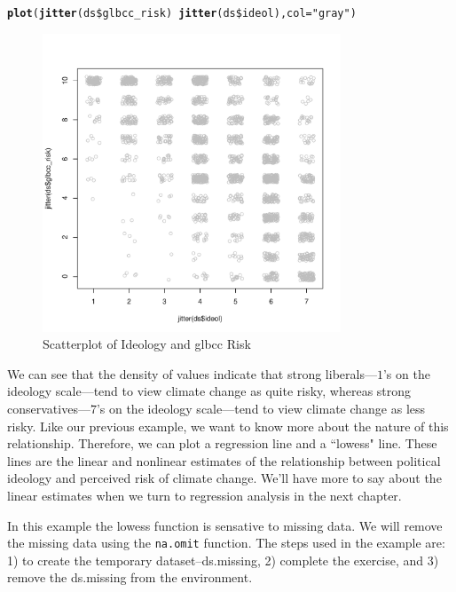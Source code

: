 \documentclass[11pt,openany]{book}\usepackage[]{graphicx}\usepackage[]{color}
\makeatletter
\newcommand{\hlstr}[1]{\textcolor[rgb]{0.192,0.494,0.8}{#1}}%
\newcommand{\hlopt}[1]{\textcolor[rgb]{0,0,0}{#1}}%
\newcommand{\hlstd}[1]{\textcolor[rgb]{0.345,0.345,0.345}{#1}}%
\newcommand{\hlkwc}[1]{\textcolor[rgb]{0.333,0.667,0.333}{#1}}%
\newcommand{\hlkwd}[1]{\textcolor[rgb]{0.737,0.353,0.396}{\textbf{#1}}}%
\newenvironment{kframe}{%
 \def\at@end@of@kframe{}%
 \ifinner\ifhmode%
  \def\at@end@of@kframe{\end{minipage}}%
  \begin{minipage}{\columnwidth}%
 \fi\fi%
 \def\FrameCommand##1{\hskip\@totalleftmargin \hskip-\fboxsep
 \colorbox{shadecolor}{##1}\hskip-\fboxsep
     \hskip-\linewidth \hskip-\@totalleftmargin \hskip\columnwidth}%
 \MakeFramed {\advance\hsize-\width
   \@totalleftmargin\z@ \linewidth\hsize
   \@setminipage}}%
 {\par\unskip\endMakeFramed%
 \at@end@of@kframe}
\newenvironment{knitrout}{}{} %
\renewenvironment{knitrout}{\begin{singlespace}}{\end{singlespace}}
\makeatother
\begin{document}
\begin{knitrout}
\color{fgcolor}\begin{kframe}
\begin{alltt}
\hlkwd{plot}\hlstd{(}\hlkwd{jitter}\hlstd{(ds}\hlopt{\$}\hlstd{glbcc_risk)} \hlopt{~} \hlkwd{jitter}\hlstd{(ds}\hlopt{\$}\hlstd{ideol),} \hlkwc{col} \hlstd{=} \hlstr{"gray"}\hlstd{)}
\end{alltt}
\end{kframe}
\end{knitrout}

\begin{figure}[!htp]
\includegraphics[width=3.5in, height=3.5in]{06_Association/scatjit.pdf}%
\caption{Scatterplot of Ideology and glbcc Risk \label{fig:scatjit}}
\end{figure}   

We can see that the density of values indicate that strong liberals---$1$'s on the ideology scale---tend to view climate change as quite risky, whereas strong conservatives---$7$'s on the ideology scale---tend to view climate change as less risky. Like our previous example, we want to know more about the nature of this relationship. Therefore, we can plot a regression line and a ``lowess" line. These lines are the linear and nonlinear estimates of the relationship between political ideology and perceived risk of climate change. We'll have more to say about the linear estimates when we turn to regression analysis in the next chapter.

In this example the lowess function is sensative to missing data.  We will remove the missing data using the \texttt{na.omit} function.  The steps used in the example are: 1) to create the temporary dataset--ds.missing, 2) complete the exercise, and 3) remove the ds.missing from the environment.
\end{document}

